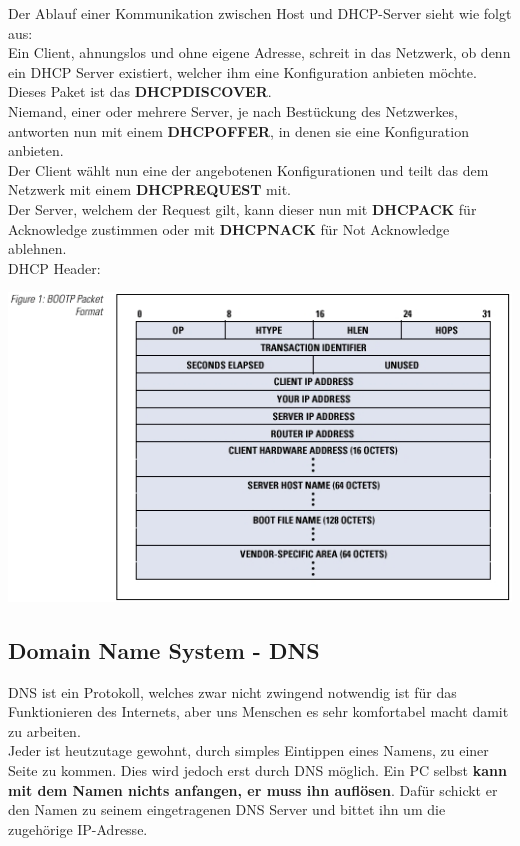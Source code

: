 \documentclass[12pt,a4paper]{report}
\begin{document}
\begin{onehalfspace}
Der Ablauf einer Kommunikation zwischen Host und DHCP-Server sieht wie folgt aus:\\
Ein Client, ahnungslos und ohne eigene Adresse, schreit in das Netzwerk, ob denn ein DHCP Server existiert, welcher ihm eine Konfiguration anbieten möchte. Dieses Paket ist das \textbf{DHCPDISCOVER}.\\
Niemand, einer oder mehrere Server, je nach Bestückung des Netzwerkes, antworten nun mit einem \textbf{DHCPOFFER}, in denen sie eine Konfiguration anbieten.\\
Der Client wählt nun eine der angebotenen Konfigurationen und teilt das dem Netzwerk mit einem \textbf{DHCPREQUEST} mit.\\
Der Server, welchem der Request gilt, kann dieser nun mit \textbf{DHCPACK} für Acknowledge zustimmen oder mit \textbf{DHCPNACK} für Not Acknowledge ablehnen.\\

DHCP Header:\\
\begin{center}
\includegraphics[scale=0.7]{../docs/tarkes/pics/dhcpheader.jpg}
\end{center}
\subsection{Domain Name System - DNS} \label{ssec:DNS}
DNS ist ein Protokoll, welches zwar nicht zwingend notwendig ist für das Funktionieren des Internets, aber uns Menschen es sehr komfortabel macht damit zu arbeiten.\\
Jeder ist heutzutage gewohnt, durch simples Eintippen eines Namens, zu einer Seite zu kommen. Dies wird jedoch erst durch DNS möglich. Ein PC selbst \textbf{kann mit dem Namen nichts anfangen, er muss ihn auflösen}. Dafür schickt er den Namen zu seinem eingetragenen DNS Server und bittet ihn um die zugehörige IP-Adresse.\\


\end{onehalfspace}
\end{document}
